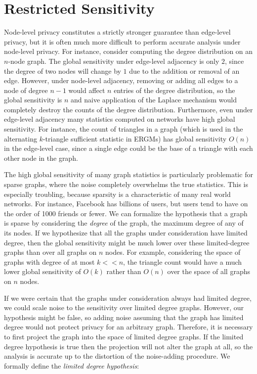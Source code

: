 \section{Restricted Sensitivity}
\label{sec:restricted_sensitivity}

 Node-level privacy constitutes a strictly stronger guarantee than edge-level privacy, but it is often much more difficult to perform accurate analysis under node-level privacy. For instance, consider computing the degree distribution on an $n$-node graph. The global sensitivity under edge-level adjacency is only $2$, since the degree of two nodes will change by $1$ due to the addition or removal of an edge. However, under node-level adjacency, removing or adding all edges to a node of degree $n-1$ would affect $n$ entries of the degree distribution, so the global sensitivity is $n$ and naive application of the Laplace mechanism would completely destroy the counts of the degree distribution. Furthermore, even under edge-level adjacency many statistics computed on networks have high global sensitivity. For instance, the count of triangles in a graph (which is used in the alternating $k$-triangle sufficient statistic in ERGMs) has global sensitivity $O(n)$ in the edge-level case, since a single edge could be the base of a triangle with each other node in the graph.
 
 The high global sensitivity of many graph statistics is particularly problematic for sparse graphs, where the noise completely overwhelms the true statistics. This is especially troubling, because sparsity is a characteristic of many real world networks. For instance, Facebook has billions of users, but  users tend to have on the order of 1000 friends or fewer. We can formalize the hypothesis that a graph is sparse by considering the \emph{degree} of the graph, the maximum degree of any of its nodes. If we hypothesize that all the graphs under consideration have limited degree, then the global sensitivity might be much lower over these limited-degree graphs than over all graphs on $n$ nodes. For example, considering the space of graphs with degree of at most $k << n$, the triangle count would have a much lower global sensitivity of $O(k)$ rather than $O(n)$ over the space of all graphs on $n$ nodes.
 
 If we were certain that the graphs under consideration always had limited degree, we could scale noise to the sensitivity over limited degree graphs. However, our hypothesis might be false, so adding noise assuming that the graph has limited degree would not protect privacy for an arbitrary graph.  Therefore, it is necessary to first project the graph into the space of limited degree graphs. If the limited degree hypothesis is true then the projection will not alter the graph at all, so the analysis is accurate up to the distortion of the noise-adding procedure. We formally define the \emph{limited degree hypothesis}:
 
